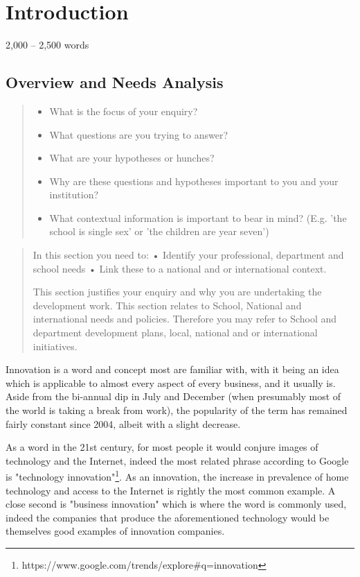 \section{Introduction}
2,000 – 2,500 words\citep{Frame61:online}

\subsection{Overview and Needs Analysis}
\begin{quote}
\begin{itemize}

\item  What is the focus of your enquiry?
\item What questions are you trying to answer?
\item What are your hypotheses or hunches?
\item Why are these questions and hypotheses important to you and your institution?
\item What contextual information is important to bear in mind? (E.g. 'the school is single sex' or 'the children are year seven')

\end{itemize}
\end{quote}

\begin{quote}
In this section you need to:
•	Identify your professional, department and school needs
•	Link these to a national and or international context.

This section justifies your enquiry and why you are undertaking the development work. This section relates to School, National and international needs and policies. Therefore you may refer to School and department development plans, local, national and or international initiatives.
\end{quote}

Innovation is a word and concept most are familiar with, with it being an idea which is applicable to almost every aspect of every business, and it usually is. Aside from the bi-annual dip in July and December (when presumably most of the world is taking a break from work), the popularity of the term has remained fairly constant since 2004, albeit with a slight decrease.

As a word in the 21st century, for most people it would conjure images of technology and the Internet, indeed the most related phrase according to Google is "technology innovation"\footnote{https://www.google.com/trends/explore#q=innovation}. As an innovation, the increase in prevalence of home technology and access to the Internet is rightly the most common example. A close second is "business innovation" which is where the word is commonly used, indeed the companies that produce the aforementioned technology would be themselves good examples of innovation companies.

